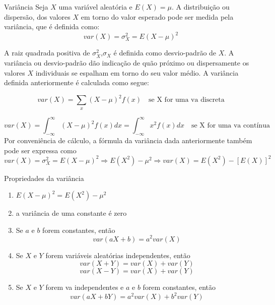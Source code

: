 \documentclass{beamer}
\begin{document}
\begin{frame}{Variância}
\footnotesize
Seja $X$ uma variável aleatória e $E(X)=\mu$. A distribuição ou dispersão, dos valores $X$ em torno do valor esperado pode ser medida pela variância, que é definida como:
$$
var(X)=\sigma^2_X=E(X-\mu)^2
$$

A raiz quadrada positiva de $\sigma^2_X$,$\sigma_X$ é definida como desvio-padrão de $X$. A variância ou desvio-padrão dão indicação de quão próximo ou dispersamente os valores $X$ individuais se espalham em torno do seu valor médio. A variância definida anteriormente é calculada como segue:

$$
var(X)=\displaystyle\sum_{x}(X-\mu)^2 f(x)\quad\mbox{se X for uma va discreta}
$$

$$
var(X)=\displaystyle\int^{\infty}_{-\infty} (X-\mu)^2 f(x) dx=\displaystyle\int_{-\infty}^{\infty}x^2 f(x)dx\quad\mbox{se X for uma va contínua}
$$
Por conveniência de cálculo, a fórmula da variância dada anteriormente também pode ser expressa como
    $$
    var(X)=\sigma_X^2=E(X-\mu)^2\Rightarrow   E(X^2)-\mu^2\Rightarrow  var(X)=E(X^2)-[E(X)]^2
    $$
  
\end{frame}
\begin{frame}{Propriedades da variância}
    \begin{enumerate}
        \item $E(X-\mu)^2=E(X^2)-\mu^2$
        \item a variância de uma constante é zero
        \item Se $a$ e $b$ forem constantes, então
        $$
        var(aX+b)=a^2 var(X)
        $$
        \item Se $X$ e $Y$ forem variáveis aleatórias independentes, então
        $$
        var(X+Y)=var(X)+var(Y)
        $$
        $$
        var(X-Y)=var(X)+var(Y)
        $$
        \item Se $X$ e $Y$ forem va independentes e $a$ e $b$ forem constantes, então
        $$
        var(aX+bY)=a^2 var(X)+b^2 var(Y)
        $$
    \end{enumerate}


\end{frame}
\end{document}
